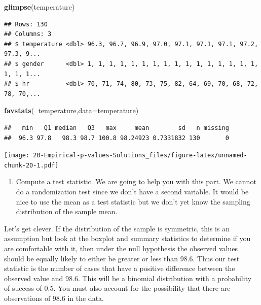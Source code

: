 \documentclass[
]{book}
\newenvironment{Shaded}{\begin{snugshade}}{\end{snugshade}}
\newcommand{\DataTypeTok}[1]{\textcolor[rgb]{0.13,0.29,0.53}{#1}}
\newcommand{\KeywordTok}[1]{\textcolor[rgb]{0.13,0.29,0.53}{\textbf{#1}}}
\newcommand{\NormalTok}[1]{#1}
\newcommand{\OperatorTok}[1]{\textcolor[rgb]{0.81,0.36,0.00}{\textbf{#1}}}
\newcommand{\StringTok}[1]{\textcolor[rgb]{0.31,0.60,0.02}{#1}}
\providecommand{\tightlist}{%
  \setlength{\itemsep}{0pt}\setlength{\parskip}{0pt}}
\begin{document}
\begin{Shaded}
\begin{Highlighting}[]
\KeywordTok{glimpse}\NormalTok{(temperature)}
\end{Highlighting}
\end{Shaded}

\begin{verbatim}
## Rows: 130
## Columns: 3
## $ temperature <dbl> 96.3, 96.7, 96.9, 97.0, 97.1, 97.1, 97.1, 97.2, 97.3, 9...
## $ gender      <dbl> 1, 1, 1, 1, 1, 1, 1, 1, 1, 1, 1, 1, 1, 1, 1, 1, 1, 1, 1...
## $ hr          <dbl> 70, 71, 74, 80, 73, 75, 82, 64, 69, 70, 68, 72, 78, 70,...
\end{verbatim}

\begin{Shaded}
\begin{Highlighting}[]
\KeywordTok{favstats}\NormalTok{(}\OperatorTok{~}\NormalTok{temperature,}\DataTypeTok{data=}\NormalTok{temperature)}
\end{Highlighting}
\end{Shaded}

\begin{verbatim}
##   min   Q1 median   Q3   max     mean        sd   n missing
##  96.3 97.8   98.3 98.7 100.8 98.24923 0.7331832 130       0
\end{verbatim}

\begin{Shaded}
\end{Shaded}

\texttt{[image: 20-Empirical-p-values-Solutions\_files/figure-latex/unnamed-chunk-20-1.pdf]}

\begin{enumerate}
\def\labelenumi{\alph{enumi}.}
\setcounter{enumi}{3}
\tightlist
\item
  Compute a test statistic. We are going to help you with this part. We cannot do a randomization test since we don't have a second variable. It would be nice to use the mean as a test statistic but we don't yet know the sampling distribution of the sample mean.
\end{enumerate}

Let's get clever. If the distribution of the sample is symmetric, this is an assumption but look at the boxplot and summary statistics to determine if you are comfortable with it, then under the null hypothesis the observed values should be equally likely to either be greater or less than 98.6. Thus our test statistic is the number of cases that have a positive difference between the observed value and 98.6. This will be a binomial distribution with a probability of success of 0.5. You must also account for the possibility that there are observations of 98.6 in the data.
\end{document}

